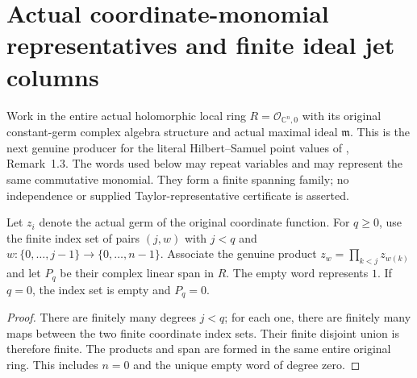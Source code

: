 \section{Actual coordinate-monomial representatives and finite ideal jet columns}
\label{sec:hironaka-holomorphic-jet-monomial-span}

Work in the entire actual holomorphic local ring $R=\mathcal O_{\mathbb C^n,0}$
with its original constant-germ complex algebra structure and actual maximal
ideal $\mathfrak m$. This is the next genuine producer for the literal
Hilbert--Samuel point values of \cite{bierstone-milman97-invent-math},
Remark~1.3. The words used below may repeat variables and may represent the
same commutative monomial. They form a finite spanning family; no independence
or supplied Taylor-representative certificate is asserted.

\begin{definition}
\label{hir:actual-finite-coordinate-words}
\leanok
{}
Let $z_i$ denote the actual germ of the original coordinate function.
For $q\ge0$, use the finite index set of pairs $(j,w)$ with $j<q$ and
$w:\{0,\ldots,j-1\}\to\{0,\ldots,n-1\}$. Associate the genuine product
$z_w=\prod_{k<j}z_{w(k)}$ and let $P_q$ be their complex linear span in $R$.
The empty word represents $1$. If $q=0$, the index set is empty and $P_q=0$.
\end{definition}
\begin{proof}
There are finitely many degrees $j<q$; for each one, there are finitely
many maps between the two finite coordinate index sets. Their finite
disjoint union is therefore finite. The products and span are formed in
the same entire original ring. This includes $n=0$ and the unique empty
word of degree zero.
\end{proof}

